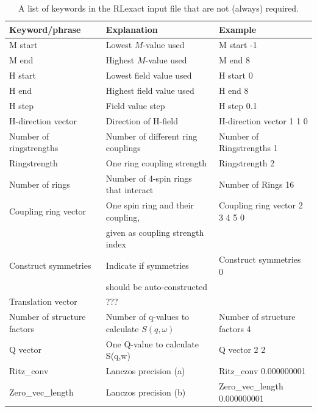 \documentclass{article}
\begin{document}
\begin{table}
\begin{tabular}{|l|l|l|} \hline
Keyword/phrase & Explanation & Example \\ \hline
M start & Lowest $M$-value used & M start -1 \\
M end & Highest $M$-value used & M end 8 \\
H start & Lowest field value used & H start 0 \\
H end & Highest field value used & H end 8 \\
H step & Field value step & H step 0.1 \\
H-direction vector & Direction of H-field & H-direction vector 1 1 0 \\
Number of ringstrengths & Number of different ring couplings & Number of Ringstrengths 1 \\
Ringstrength & One ring coupling strength  & Ringstrength 2 \\
Number of rings & Number of 4-spin rings that interact & Number of Rings 16 \\
Coupling ring vector & One spin ring and their coupling,  & Coupling ring vector 2 3 4 5 0 \\
 & \hspace{5mm} given as coupling strength index& \\ \hline
Construct symmetries & Indicate if symmetries  & Construct symmetries 0 \\
 & \hspace{5mm} should be auto-constructed& \\
Translation vector & ??? & \\
Number of structure factors & Number of q-values to calculate $S(q,\omega)$ & Number of structure factors 4 \\
Q vector & One Q-value to calculate S(q,w) & Q vector 2 2 \\
Ritz\_conv & Lanczos precision (a) & Ritz\_conv 0.000000001 \\
Zero\_vec\_length & Lanczos precision (b) & Zero\_vec\_length 0.000000001 \\
\hline
\end{tabular}
\caption{A list of keywords in the RLexact input file that are not (always) required.} \label{tab:optional_keywords}
\end{table}
\end{document}
